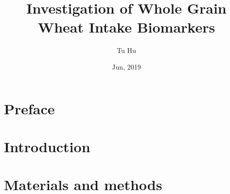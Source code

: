 \documentclass[]{article}
\title{Investigation of Whole Grain Wheat Intake Biomarkers}
\author{Tu Hu}
\subtitle{}
\date{Jun, 2019}
\begin{document}
\maketitle

\tableofcontents
\newpage

\printglossaries
\newpage
\section{Preface}


\section{Introduction}


\section{Materials and methods}

\end{document}
